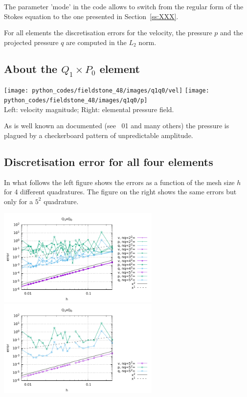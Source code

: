 The parameter 'mode' in the code allows to switch from the regular form of the Stokes 
equation to the one presented in Section~\ref{ss:XXX}. 

For all elements the discretisation errors for the velocity, the pressure $p$ and 
the projected pressure $q$ are computed in the $L_2$ norm. 

\subsection*{About the $Q_1\times P_0$ element}

\begin{center}
\texttt{[image: python\_codes/fieldstone\_48/images/q1q0/vel]}
\texttt{[image: python\_codes/fieldstone\_48/images/q1q0/p]}\\
{\captionfont Left: velocity magnitude; Right: elemental pressure field.}
\end{center}

As is well known an documented (see \stone~01 and many others)
the pressure is plagued by a checkerboard pattern of unpredictable 
amplitude.

\subsection*{Discretisation error for all four elements}

In what follows the left figure shows the errors as a function of 
the mesh size $h$ for 4 different quadratures. 
The figure on the right shows the same errors but only for a $5^2$ quadrature.

\begin{center}
\includegraphics[width=8cm]{python_codes/fieldstone_48/results/errors1.pdf}
\includegraphics[width=8cm]{python_codes/fieldstone_48/results/errors1_b.pdf}
\end{center}

